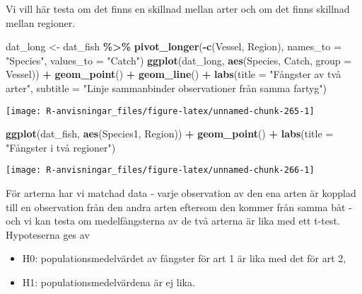 \documentclass[
]{book}
\newenvironment{Shaded}{\begin{snugshade}}{\end{snugshade}}
\newcommand{\AttributeTok}[1]{\textcolor[rgb]{0.13,0.29,0.53}{#1}}
\newcommand{\FunctionTok}[1]{\textcolor[rgb]{0.13,0.29,0.53}{\textbf{#1}}}
\newcommand{\NormalTok}[1]{#1}
\newcommand{\OtherTok}[1]{\textcolor[rgb]{0.56,0.35,0.01}{#1}}
\newcommand{\SpecialCharTok}[1]{\textcolor[rgb]{0.81,0.36,0.00}{\textbf{#1}}}
\newcommand{\StringTok}[1]{\textcolor[rgb]{0.31,0.60,0.02}{#1}}
\providecommand{\tightlist}{%
  \setlength{\itemsep}{0pt}\setlength{\parskip}{0pt}}
\theoremstyle{definition}
\theoremstyle{definition}
\theoremstyle{definition}
\theoremstyle{definition}
\theoremstyle{remark}
\begin{document}
Vi vill här testa om det finns en skillnad mellan arter och om det finns skillnad mellan regioner.

\begin{Shaded}
\begin{Highlighting}[]
\NormalTok{dat\_long }\OtherTok{\textless{}{-}}\NormalTok{ dat\_fish }\SpecialCharTok{\%\textgreater{}\%} 
  \FunctionTok{pivot\_longer}\NormalTok{(}\SpecialCharTok{{-}}\FunctionTok{c}\NormalTok{(Vessel, Region), }\AttributeTok{names\_to =} \StringTok{"Species"}\NormalTok{, }\AttributeTok{values\_to =} \StringTok{"Catch"}\NormalTok{)}
\FunctionTok{ggplot}\NormalTok{(dat\_long, }\FunctionTok{aes}\NormalTok{(Species, Catch, }\AttributeTok{group =}\NormalTok{ Vessel)) }\SpecialCharTok{+} 
  \FunctionTok{geom\_point}\NormalTok{() }\SpecialCharTok{+} 
  \FunctionTok{geom\_line}\NormalTok{() }\SpecialCharTok{+}
  \FunctionTok{labs}\NormalTok{(}\AttributeTok{title =} \StringTok{"Fångster av två arter"}\NormalTok{, }\AttributeTok{subtitle =} \StringTok{"Linje sammanbinder observationer från samma fartyg"}\NormalTok{)}
\end{Highlighting}
\end{Shaded}

\begin{center}\texttt{[image: R-anvisningar\_files/figure-latex/unnamed-chunk-265-1]} \end{center}

\begin{Shaded}
\begin{Highlighting}[]
\FunctionTok{ggplot}\NormalTok{(dat\_fish, }\FunctionTok{aes}\NormalTok{(Species1, Region)) }\SpecialCharTok{+} 
  \FunctionTok{geom\_point}\NormalTok{() }\SpecialCharTok{+}
  \FunctionTok{labs}\NormalTok{(}\AttributeTok{title =} \StringTok{"Fångster i två regioner"}\NormalTok{)}
\end{Highlighting}
\end{Shaded}

\begin{center}\texttt{[image: R-anvisningar\_files/figure-latex/unnamed-chunk-266-1]} \end{center}

För arterna har vi matchad data - varje observation av den ena arten är kopplad till en observation från den andra arten eftersom den kommer från samma båt - och vi kan testa om medelfångsterna av de två arterna är lika med ett t-test. Hypoteserna ges av

\begin{itemize}
\tightlist
\item
  H0: populationsmedelvärdet av fångster för art 1 är lika med det för art 2,
\item
  H1: populationsmedelvärdena är ej lika.
\end{itemize}
\end{document}
